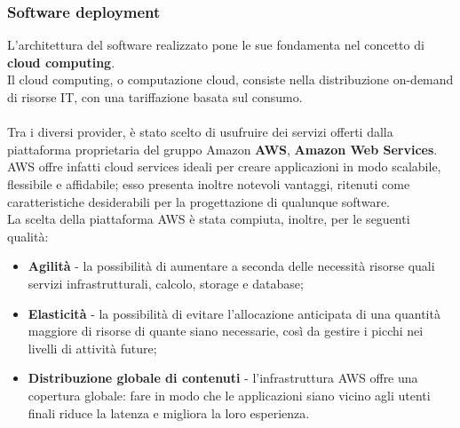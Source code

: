\documentclass{natourDoc}
\begin{document}
\newpage
\subsubsection{Software deployment}
L'architettura del software realizzato pone le sue fondamenta nel concetto di \textbf{cloud computing}.\\
Il cloud computing, o computazione cloud, consiste nella distribuzione on-demand di risorse IT, con
una tariffazione basata sul consumo.\\\\
Tra i diversi provider, è stato scelto di usufruire dei servizi offerti dalla piattaforma proprietaria del gruppo
Amazon \textbf{AWS}, \textbf{Amazon Web Services}.
AWS offre infatti cloud services ideali per creare applicazioni in modo scalabile, flessibile e affidabile; esso
presenta inoltre notevoli vantaggi, ritenuti come caratteristiche desiderabili per la progettazione di qualunque software.\\

La scelta della piattaforma AWS è stata compiuta, inoltre, per le seguenti qualità:
\begin{itemize}
	\item \textbf{Agilità} - la possibilità di aumentare a seconda delle necessità risorse quali servizi infrastrutturali,
	      calcolo, storage e database;
	\item \textbf{Elasticità} - la possibilità di evitare l'allocazione anticipata di una quantità maggiore di risorse di
	      quante siano necessarie, così da gestire i picchi nei livelli di attività future;
	\item \textbf{Distribuzione globale di contenuti} - l'infrastruttura AWS offre una copertura globale: fare in modo che le
	      applicazioni siano vicino agli utenti finali riduce la latenza e migliora la loro esperienza.\\
\end{itemize}
\end{document}
